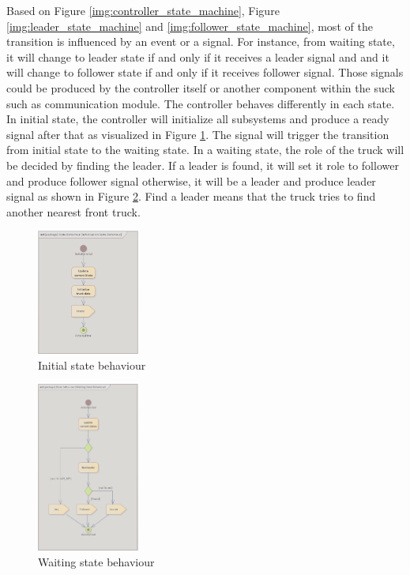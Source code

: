Based on Figure \ref{img:controller_state_machine}, Figure \ref{img:leader_state_machine} and \ref{img:follower_state_machine}, most of the transition is influenced by an event or a signal. For instance, from waiting state, it will change to leader state if and only if it receives a leader signal and and it will change to follower state if and only if it receives follower signal. Those signals could be produced by the controller itself or another component within the suck such as communication module.
The controller behaves differently in each state. In initial state, the controller will initialize all subsystems and produce a ready signal after that as visualized in Figure \ref{img:initial_state_activity}. The signal will trigger the transition from initial state to the waiting state. In a waiting state, the role of the truck will be decided by finding the leader. If a leader is found, it will set it role to follower and produce follower signal otherwise, it will be a leader and produce leader signal as shown in Figure \ref{img:waiting_state_activity}. Find a leader means that the truck tries to find another nearest front truck. 
\begin{figure}[ht]
    \centering
    \includegraphics[width=0.3\textwidth]{images/initial_state_activity.png}
    \caption{ Initial state behaviour}
    \label{img:initial_state_activity}
\end{figure}


\begin{figure}[ht]
    \centering
    \includegraphics[width=0.3\textwidth]{images/waiting_state_activity.png}
    \caption{ Waiting state behaviour}
    \label{img:waiting_state_activity}
\end{figure}


